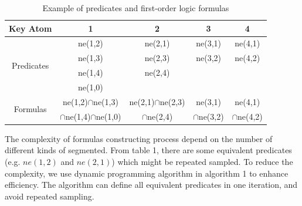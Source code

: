 \documentclass[journal]{IEEEtran}
\begin{document}
\begin{table}[!t]
\caption{Example of predicates and first-order logic formulas}
\centering
\begin{tabular}{|c|c|c|c|c|} 
\hline
Key Atom & 1 & 2 & 3 & 4\\
\hline\hline
\multirow{4}{*}{Predicates} & 
ne(1,2) & 
ne(2,1) & 
ne(3,1) &
ne(4,1)\\
\cline{2-5}
 &
ne(1,3) &
ne(2,3) &
ne(3,2) &
ne(4,2) \\
\cline{2-5}
 &
ne(1,4) &
ne(2,4) &
 &
 \\
\cline{2-5}
 &
ne(1,0) &
 &
 &
 \\
\hline
\multirow{2}{*}{Formulas} &
ne(1,2)$\cap$ne(1,3)&
ne(2,1)$\cap$ne(2,3)&
ne(3,1)&
ne(4,1)\\
 &
$\cap$ne(1,4)$\cap$ne(1,0) &
$\cap$ne(2,4)&
$\cap$ne(3,2)&
$\cap$ne(4,2)\\ 
\hline
\end{tabular} 
\end{table} 

The complexity of formulas constructing process depend on the number of different kinds of segmented. From table 1, there are some equivalent predicates (e.g. $ne(1,2)$ and $ne(2,1)$) which might be repeated sampled. To reduce the complexity, we use dynamic programming algorithm in algorithm 1 to enhance efficiency. The algorithm can define all equivalent predicates in one iteration, and avoid repeated sampling. 
\end{document}
